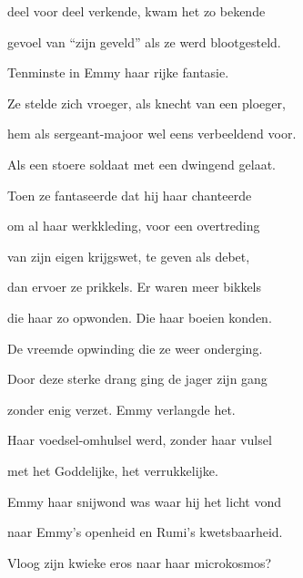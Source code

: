 deel voor deel verkende,
kwam het zo bekende

gevoel van “zijn geveld”
als ze werd blootgesteld.

Tenminste in Emmy
haar rijke fantasie.

Ze stelde zich vroeger,
als knecht van een ploeger,

hem als sergeant-majoor
wel eens verbeeldend voor.

Als een stoere soldaat
met een dwingend gelaat.

Toen ze fantaseerde
dat hij haar chanteerde

om al haar werkkleding,
voor een overtreding

van zijn eigen krijgswet,
te geven als debet,

dan ervoer ze prikkels.
Er waren meer bikkels

die haar zo opwonden.
Die haar boeien konden.

De vreemde opwinding
die ze weer onderging.

Door deze sterke drang
ging de jager zijn gang

zonder enig verzet.
Emmy verlangde het.

Haar voedsel-omhulsel
werd, zonder haar vulsel

met het Goddelijke,
het verrukkelijke.

Emmy haar snijwond
was waar hij het licht vond

naar Emmy’s openheid
en Rumi’s kwetsbaarheid.

Vloog zijn kwieke eros
naar haar microkosmos?
